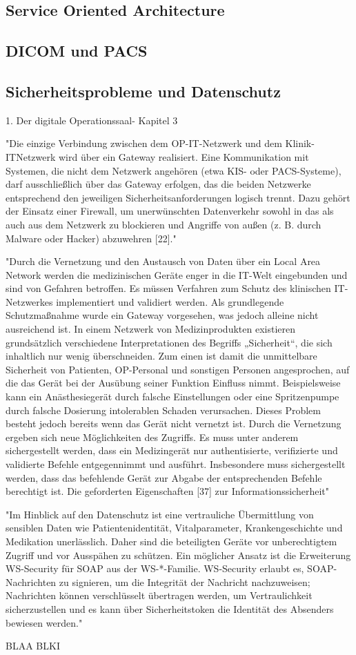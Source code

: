 	
\subsection{Service Oriented Architecture}
\subsection{DICOM und PACS}
\subsection{Sicherheitsprobleme und Datenschutz}
1. Der digitale Operationssaal- Kapitel 3

"Die einzige Verbindung zwischen dem OP-IT-Netzwerk und dem Klinik-ITNetzwerk
wird über ein Gateway realisiert. Eine Kommunikation mit Systemen, die
nicht dem Netzwerk angehören (etwa KIS- oder PACS-Systeme), darf ausschließlich
über das Gateway erfolgen, das die beiden Netzwerke entsprechend den jeweiligen
Sicherheitsanforderungen logisch trennt. Dazu gehört der Einsatz einer Firewall, um
unerwünschten Datenverkehr sowohl in das als auch aus dem Netzwerk zu blockieren
und Angriffe von außen (z. B. durch Malware oder Hacker) abzuwehren [22]."

"Durch die Vernetzung und den Austausch von Daten über ein Local Area Network
werden die medizinischen Geräte enger in die IT-Welt eingebunden und sind von
Gefahren betroffen. Es müssen Verfahren zum Schutz des klinischen IT-Netzwerkes
implementiert und validiert werden. Als grundlegende Schutzmaßnahme wurde ein
Gateway vorgesehen, was jedoch alleine nicht ausreichend ist. In einem Netzwerk von
Medizinprodukten existieren grundsätzlich verschiedene Interpretationen des Begriffs
„Sicherheit“, die sich inhaltlich nur wenig überschneiden. Zum einen ist damit die
unmittelbare Sicherheit von Patienten, OP-Personal und sonstigen Personen angesprochen,
auf die das Gerät bei der Ausübung seiner Funktion Einfluss nimmt. Beispielsweise
kann ein Anästhesiegerät durch falsche Einstellungen oder eine Spritzenpumpe
durch falsche Dosierung intolerablen Schaden verursachen. Dieses Problem besteht
jedoch bereits wenn das Gerät nicht vernetzt ist. Durch die Vernetzung ergeben sich
neue Möglichkeiten des Zugriffs. Es muss unter anderem sichergestellt werden, dass
ein Medizingerät nur authentisierte, verifizierte und validierte Befehle entgegennimmt
und ausführt. Insbesondere muss sichergestellt werden, dass das befehlende Gerät zur
Abgabe der entsprechenden Befehle berechtigt ist.
Die geforderten Eigenschaften [37] zur Informationssicherheit"

"Im Hinblick auf den Datenschutz ist eine vertrauliche
Übermittlung von sensiblen Daten wie Patientenidentität, Vitalparameter,
Krankengeschichte und Medikation unerlässlich. Daher sind die beteiligten Geräte
vor unberechtigtem Zugriff und vor Ausspähen zu schützen. Ein möglicher Ansatz ist
die Erweiterung WS-Security für SOAP aus der WS-*-Familie. WS-Security erlaubt es,
SOAP-Nachrichten zu signieren, um die Integrität der Nachricht nachzuweisen; Nachrichten
können verschlüsselt übertragen werden, um Vertraulichkeit sicherzustellen
und es kann über Sicherheitstoken die Identität des Absenders bewiesen werden."

BLAA BLKI